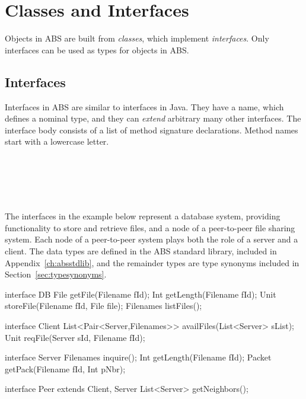 \chapter{Classes and Interfaces}
\label{sec:classandint}
Objects in ABS are built from \emph{classes}, which implement
\emph{interfaces}. Only interfaces can be used as types for objects in
ABS.

\section{Interfaces}
\label{sec:interfacedecl}
Interfaces in ABS are similar to interfaces in Java.
They have a name, which defines a nominal type, and 
they can \emph{extend} arbitrary many other interfaces.
The interface body consists of a list of method signature declarations. 
Method names start with a lowercase letter.

\begin{abssyntax}
  {}\ \ \
  \TRS{\{}\ \ \TRS{\}}\\
\NT{MethSig}        {}\ \ \TRS{(}\ \ \TRS{)}\ \TRS{;}\\
\NT{ParamList}     \defn \NT{Param}\ \\
\NT{Param}         \defn \NT{Type}\ \NT{Identifier}
\end{abssyntax}

%

The interfaces in the example below represent a database system, providing
functionality to store and retrieve files, and a node of a peer-to-peer file
sharing system. Each node of a peer-to-peer system plays both the role of a
server and a client. The data types are defined in the ABS standard library,
included in Appendix~\ref{ch:absstdlib}, and the remainder types are type synonyms
included in Section~\ref{sec:typesynonyms}.

\begin{absexample}
interface DB {
  File getFile(Filename fId);
  Int getLength(Filename fId);
  Unit storeFile(Filename fId, File file);
  Filenames listFiles();
}

interface Client {
  List<Pair<Server,Filenames>> availFiles(List<Server> sList);
  Unit reqFile(Server sId, Filename fId);
}

interface Server {
  Filenames inquire();
  Int getLength(Filename fId);
  Packet getPack(Filename fId, Int pNbr);
}

interface Peer extends Client, Server {
  List<Server> getNeighbors();
}
\end{absexample}

